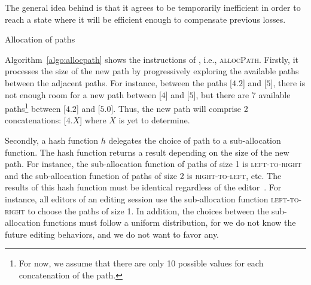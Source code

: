 \noindent The general idea behind \LSEQ is that it agrees to be temporarily
inefficient in order to reach a state where it will be efficient enough to
compensate previous losses.


\begin{algorithm}

\caption{\label{algo:allocpath}Allocation of paths}
\end{algorithm}

Algorithm~\ref{algo:allocpath} shows the instructions of \LSEQ, i.e.,
\textsc{allocPath}. Firstly, it processes the size of the new path by
progressively exploring the available paths between the adjacent paths. For
instance, between the paths [$4.2$] and [$5$], there is not enough room for a
new path between [$4$] and [$5$], but there are 7 available paths\footnote{For
  now, we assume that there are only 10 possible values for each concatenation
  of the path.} between [$4.2$] and [$5.0$]. Thus, the new path will comprise 2
concatenations: [$4.X$] where $X$ is yet to determine.

\noindent Secondly, a hash function $h$ delegates the choice of path to a
sub-allocation function. The hash function returns a result depending on the
size of the new path. For instance, the sub-allocation function of paths of size
1 is \textsc{left-to-right} and the sub-allocation function of paths of size 2
is \textsc{right-to-left}, etc. The results of this hash function must be
identical regardless of the editor~\cite{nedelec2013concurrency}. For instance,
all editors of an editing session use the sub-allocation function
\textsc{left-to-right} to choose the paths of size 1. In addition, the choices
between the sub-allocation functions must follow a uniform distribution, for we
do not know the future editing behaviors, and we do not want to favor any.




